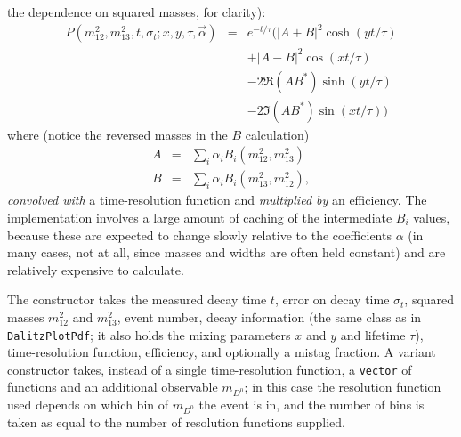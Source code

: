 \documentclass[12pt,pdflatex]{article}
\begin{document}
\begin{itemize}
the dependence on squared masses, for clarity):
\begin{eqnarray}
\label{eq:fullmix}
P(m^2_{12}, m^2_{13}, t, \sigma_t;x,y,\tau,\vec\alpha) &=&
e^{-t/\tau}\Big(|A+B|^2\cosh(yt/\tau)\\
&& + |A-B|^2\cos(xt/\tau)\\
&& - 2\Re(AB^*)\sinh(yt/\tau)\\
&& - 2\Im(AB^*)\sin(xt/\tau)\Big)
\end{eqnarray}
where (notice the reversed masses in the $B$ calculation)
\begin{eqnarray}
A &=& \sum\limits_i \alpha_iB_i(m^2_{12}, m^2_{13}) \\
B &=& \sum\limits_i \alpha_iB_i(m^2_{13}, m^2_{12}), 
\end{eqnarray}
\emph{convolved with} a time-resolution function and \emph{multiplied by} an efficiency. 
The implementation involves a large
amount of caching of the intermediate $B_i$ values, because these are expected
to change slowly relative to the coefficients $\alpha$ (in many cases, not at all, 
since masses and widths are often held constant) and are relatively expensive to calculate. 

The constructor takes the measured decay time $t$, error on decay time $\sigma_t$, 
squared masses $m^2_{12}$ and $m^2_{13}$, event number, decay information (the same
class as in \texttt{DalitzPlotPdf}; it also holds the mixing parameters
$x$ and $y$ and lifetime $\tau$), time-resolution function, efficiency, and optionally
a mistag fraction. A variant constructor takes, instead of a single time-resolution
function, a \texttt{vector} of functions and an additional observable $m_{D^0}$;
in this case the resolution function used depends on which bin of $m_{D^0}$ the event
is in, and the number of bins is taken as equal to the number of resolution functions
supplied. 


\end{itemize}
\end{document}
